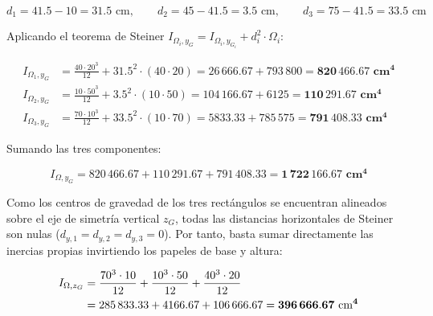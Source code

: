 {    \begin{equation}
        d_1 = 41.5 - 10 = 31.5\text{ cm}, \qquad d_2 = 45 - 41.5 = 3.5\text{ cm}, \qquad d_3 = 75 - 41.5 = 33.5\text{ cm}
\end{equation}

    Aplicando el teorema de Steiner $I_{\Omega_i, y_G} = I_{\Omega_i, y_{G_i}} + d_i^2 \cdot \Omega_i$:

    \begin{align}
        I_{\Omega_1, y_G} & = \frac{40 \cdot 20^3}{12} + 31.5^2 \cdot (40 \cdot 20) = 26\,666.67 + 793\,800 = \mathbf{820\,466.67\text{ cm}^4} \\[6pt]
        I_{\Omega_2, y_G} & = \frac{10 \cdot 50^3}{12} + 3.5^2 \cdot (10 \cdot 50) = 104\,166.67 + 6125 = \mathbf{110\,291.67\text{ cm}^4}     \\[6pt]
        I_{\Omega_3, y_G} & = \frac{70 \cdot 10^3}{12} + 33.5^2 \cdot (10 \cdot 70) = 5833.33 + 785\,575 = \mathbf{791\,408.33\text{ cm}^4}
\end{align}

    Sumando las tres componentes:

    \begin{equation}
        I_{\Omega, y_G} = 820\,466.67 + 110\,291.67 + 791\,408.33 = \mathbf{1\,722\,166.67\text{ cm}^4}
\end{equation}






    Como los centros de gravedad de los tres rectángulos se encuentran alineados sobre el eje de simetría vertical $z_G$, todas las distancias horizontales de Steiner son nulas ($d_{y,1} = d_{y,2} = d_{y,3} = 0$). Por tanto, basta sumar directamente las inercias propias invirtiendo los papeles de base y altura:

    \begin{align}
        I_{\Omega, z_G} & = \frac{70^3 \cdot 10}{12} + \frac{10^3 \cdot 50}{12} + \frac{40^3 \cdot 20}{12} \notag \\
                        & = 285\,833.33 + 4166.67 + 106\,666.67 = \mathbf{396\,666.67\text{ cm}^4}
\end{align}

}



